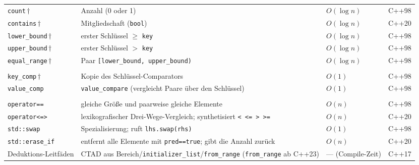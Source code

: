 \begin{longtable}{@{}>{\raggedright\arraybackslash}p{3.1cm} >{\raggedright\arraybackslash}p{5.7cm} >{\raggedright\arraybackslash}p{2.7cm} >{\raggedright\arraybackslash}p{1.1cm}@{}}
  \texttt{count}\,$\dagger$ & Anzahl (0 oder 1) & $O(\log n)$ & C++98 \\
  \texttt{contains}\,$\dagger$ & Mitgliedschaft (\texttt{bool}) & $O(\log n)$ & C++20 \\
  \texttt{lower\_bound}\,$\dagger$ & erster Schlüssel $\ge$ \texttt{key} & $O(\log n)$ & C++98 \\
  \texttt{upper\_bound}\,$\dagger$ & erster Schlüssel $>$ \texttt{key} & $O(\log n)$ & C++98 \\
  \texttt{equal\_range}\,$\dagger$ & Paar \texttt{[lower\_bound,\allowbreak\,upper\_bound)} & $O(\log n)$ & C++98 \\ %
  \addlinespace[3pt]
  \multicolumn{4}{@{}l}{\textbf{Beobachter}}\\
  \addlinespace[2pt]
  \texttt{key\_comp}\,$\dagger$ & Kopie des Schlüssel-Comparators & $O(1)$ & C++98 \\
  \texttt{value\_comp} & \texttt{value\_compare} (vergleicht Paare über den Schlüssel) & $O(1)$ & C++98 \\
  \addlinespace[3pt]
  \multicolumn{4}{@{}l}{\textbf{Nicht-Member-Funktionen}}\\
  \addlinespace[2pt]
  \texttt{operator==} & gleiche Größe und paarweise gleiche Elemente & $O(n)$ & C++98 \\
  \texttt{operator<=>} & lexikografischer Drei-Wege-Vergleich; synthetisiert \texttt{<\,<=\,>\,>=} & $O(n)$ & C++20 \\
  \texttt{std::swap} & Spezialisierung; ruft \texttt{lhs.swap(rhs)} & $O(1)$ & C++98 \\
  \texttt{std::erase\_if} & entfernt alle Elemente mit \texttt{pred==true}; gibt die Anzahl zurück & $O(n)$ & C++20 \\
  Deduktions-Leitfäden & CTAD aus Bereich/\allowbreak\texttt{initializer\_list}/\allowbreak\texttt{from\_range} (\texttt{from\_range} ab C++23) & --- (Compile-Zeit) & C++17 \\
  \bottomrule
\end{longtable}

